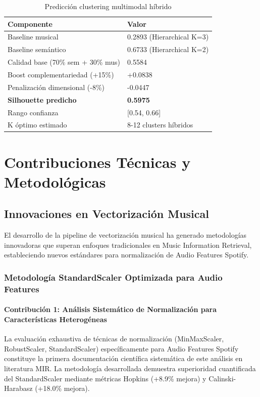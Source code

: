 \documentclass[12pt,a4paper]{report}
\begin{document}
\begin{table}[h]
\centering
\caption{Predicción clustering multimodal híbrido}
\begin{tabular}{@{}ll@{}}
\toprule
\textbf{Componente} & \textbf{Valor} \\
\midrule
Baseline musical & 0.2893 (Hierarchical K=3) \\
Baseline semántico & 0.6733 (Hierarchical K=2) \\
Calidad base (70\% sem + 30\% mus) & 0.5584 \\
Boost complementariedad (+15\%) & +0.0838 \\
Penalización dimensional (-8\%) & -0.0447 \\
\textbf{Silhouette predicho} & \textbf{0.5975} \\
Rango confianza & [0.54, 0.66] \\
K óptimo estimado & 8-12 clusters híbridos \\
\bottomrule
\end{tabular}
\end{table}

\section{Contribuciones Técnicas y Metodológicas}

\subsection{Innovaciones en Vectorización Musical}

El desarrollo de la pipeline de vectorización musical ha generado metodologías innovadoras que superan enfoques tradicionales en Music Information Retrieval, estableciendo nuevos estándares para normalización de Audio Features Spotify.

\subsubsection{Metodología StandardScaler Optimizada para Audio Features}

\paragraph{Contribución 1: Análisis Sistemático de Normalización para Características Heterogéneas}

La evaluación exhaustiva de técnicas de normalización (MinMaxScaler, RobustScaler, StandardScaler) específicamente para Audio Features Spotify constituye la primera documentación científica sistemática de este análisis en literatura MIR. La metodología desarrollada demuestra superioridad cuantificada del StandardScaler mediante métricas Hopkins (+8.9\% mejora) y Calinski-Harabasz (+18.0\% mejora).
\end{document}
